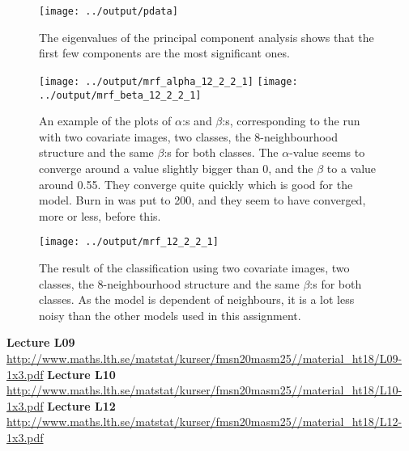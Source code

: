 \documentclass[a4paper,english]{article}
\newcommand{\sexion}[1]{\section{#1}}
\begin{document}
\begin{figure}[H]
	\centering
    \texttt{[image: ../output/pdata]}
    \caption{The eigenvalues of the principal component analysis shows that the first few components are the most significant ones.}
    \label{fig:pca}
\end{figure}

\begin{figure}[H]
  \centering
  \texttt{[image: ../output/mrf\_alpha\_12\_2\_2\_1]}
  \texttt{[image: ../output/mrf\_beta\_12\_2\_2\_1]}
  \caption{An example of the plots of $\alpha$:s and $\beta$:s, corresponding to the run with two covariate images, two classes, the 8-neighbourhood structure and the same $\beta$:s for both classes. The $\alpha$-value seems to converge around a value slightly bigger than 0, and the $\beta$ to a value around 0.55. They converge quite quickly which is good for the model. Burn in was put to 200, and they seem to have converged, more or less, before this.}
  \label{fig:alphabeta}
\end{figure}

\begin{figure}[H]
	\centering
    \texttt{[image: ../output/mrf\_12\_2\_2\_1]}
    \caption{The result of the classification using two covariate images, two classes, the 8-neighbourhood structure and the same $\beta$:s for both classes. As the model is dependent of neighbours, it is a lot less noisy than the other models used in this assignment.}
    \label{fig:mrf}
\end{figure}

\newpage

\begin{thebibliography}{37}
  \textbf{Lecture L09} \\
\url{http://www.maths.lth.se/matstat/kurser/fmsn20masm25//material_ht18/L09-1x3.pdf}
  \textbf{Lecture L10} \\
\url{http://www.maths.lth.se/matstat/kurser/fmsn20masm25//material_ht18/L10-1x3.pdf}
  \textbf{Lecture L12} \\
\url{http://www.maths.lth.se/matstat/kurser/fmsn20masm25//material_ht18/L12-1x3.pdf}
\end{thebibliography}
\pagebreak{}



% 


\pagebreak{}
\thispagestyle{empty}
\end{document}
